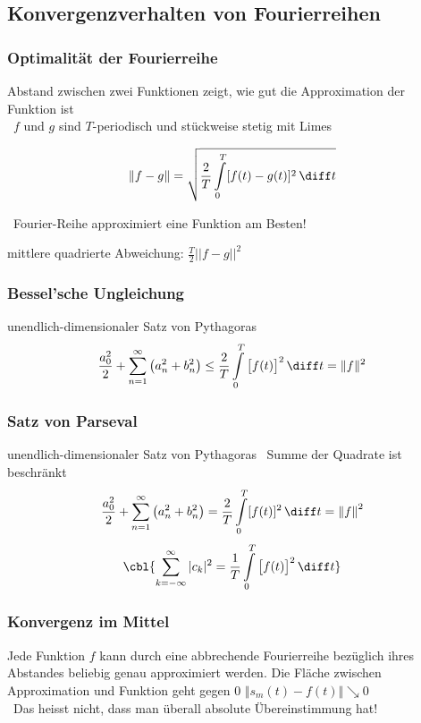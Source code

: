 \subsection{Konvergenzverhalten von Fourierreihen}

\subsubsection{Optimalität der Fourierreihe}

Abstand zwischen zwei Funktionen zeigt, wie gut die Approximation der Funktion ist \\
\textrightarrow\ $f$ und $g$ sind $T$-periodisch und stückweise stetig mit Limes

$$ \left\| f - g \right\| = \sqrt{\frac{2}{T} \int \limits_0^T  [f(t) - g(t)]^2 \, \diff t } $$ 

\textrightarrow\ Fourier-Reihe approximiert eine Funktion am Besten!

\smallskip

mittlere quadrierte Abweichung: $\frac{T}{2} \vert \vert f - g \vert \vert ^2$


\subsubsection{Bessel'sche Ungleichung}

unendlich-dimensionaler Satz von Pythagoras
$$ \frac{a_0^2}{2} + \sum \limits_{n=1}^\infty \big( a_n^2 + b_n^2 \big) \leq  \frac{2}{T} \int \limits_0^T \big[f(t) \big]^2 \, \diff t = \Vert f \Vert ^2 $$


\subsubsection{Satz von Parseval}

unendlich-dimensionaler Satz von Pythagoras \textrightarrow\ Summe der Quadrate ist beschränkt
$$ \frac{a_0^2}{2} + \sum \limits_{n=1}^\infty \big( a_n^2 + b_n^2 \big) = \frac{2}{T} \int \limits_0^T [f(t)]^2 \, \diff t = \left\| f \right\|^2 $$
$$ \cbl{ \sum \limits_{k= -\infty}^\infty \vert c_k \vert ^2 = \frac{1}{T} \int \limits_0^T \big[ f(t) \big]^2 \, \diff t } $$


\subsubsection{Konvergenz im Mittel}

Jede Funktion $f$ kann durch eine abbrechende Fourierreihe bezüglich ihres Abstandes beliebig genau approximiert werden.
Die Fläche zwischen Approximation und Funktion geht gegen 0 \quad $\Vert s_m(t) - f(t) \Vert \searrow 0$ \\
\textrightarrow\ Das heisst nicht, dass man überall absolute Übereinstimmung hat!

